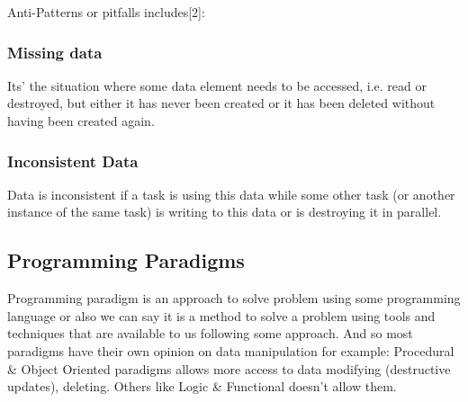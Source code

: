 \documentclass[12pt,twoside]{article}
\begin{document}
Anti-Patterns or pitfalls includes[2]:

\subsubsection{Missing data}
Its' the situation where some data element needs to be accessed, i.e. read or destroyed, but either it has never been created or it has been deleted without having been created again.
\subsubsection{Inconsistent Data} 
Data is inconsistent if a task is using this data while some other task (or another instance of the same task) is writing to this data or is destroying it in parallel.
\subsection{Programming Paradigms}
Programming paradigm is an approach to solve problem using some programming language or also we can say it is a method to solve a problem using tools and techniques that are available to us following some approach.
And so most paradigms have their own opinion on data manipulation for example: Procedural \& Object Oriented paradigms allows more access to data modifying (destructive updates), deleting. Others like Logic \& Functional doesn't allow them.
\end{document}
